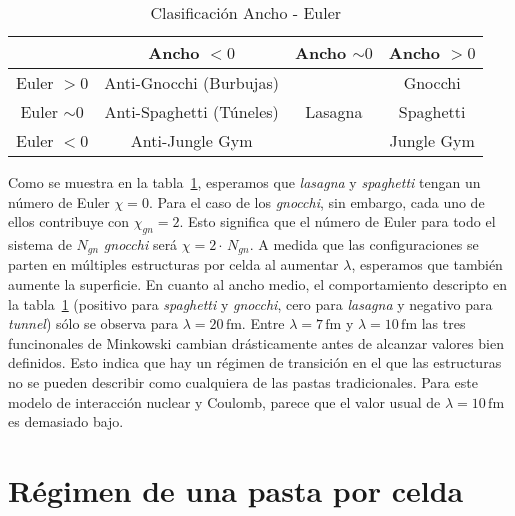 \begin{table}[ht] \centering
\caption{Clasificación Ancho - Euler}
\begin{tabular}{c|| c | c | c} \hline & Ancho $<0$ & Ancho
$\sim 0$ & Ancho $>0$ \\
               
\hline\hline Euler $>0$ & Anti-Gnocchi (Burbujas) & & Gnocchi \\

Euler $\sim0$ & Anti-Spaghetti (Túneles) & Lasagna & Spaghetti \\

Euler $<0$ & Anti-Jungle Gym & & Jungle Gym \\ [1ex] \hline
\end{tabular}
\label{tab:mink}
\end{table}

Como se muestra en la tabla~\ref{tab:mink}, esperamos que \emph{lasagna} y \emph{spaghetti} tengan un número de Euler $\chi=0$.
Para el caso de los \emph{gnocchi}, sin embargo, cada uno de ellos contribuye con $\chi_{gn}=2$.
Esto significa que el número de Euler para todo el sistema de $N_{gn}$ \emph{gnocchi} será $\chi=2\cdot\,N_{gn}$.
A medida que las configuraciones se parten en múltiples estructuras por celda al aumentar $\lambda$, esperamos que también aumente la superficie.
En cuanto al ancho medio, el comportamiento descripto en la tabla~\ref{tab:mink} (positivo para \emph{spaghetti} y \emph{gnocchi}, cero para \emph{lasagna} y negativo para \emph{tunnel}) sólo se observa para $\lambda=20\,\text{fm}$.
Entre $\lambda=7\,\text{fm}$ y $\lambda=10\,\text{fm}$ las tres funcinonales de Minkowski cambian drásticamente antes de alcanzar valores bien definidos.
Esto indica que hay un régimen de transición en el que las estructuras no se pueden describir como cualquiera de las pastas tradicionales.
Para este modelo de interacción nuclear y Coulomb, parece que el valor usual de $\lambda=10\,\text{fm}$ es demasiado bajo.


\section{Régimen de una pasta por celda} \label{pasta-bup}

